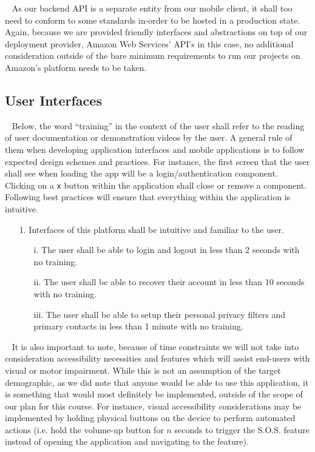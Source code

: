 \documentclass{scrreprt}
\begin{document}
\par ~ As our backend API is a separate entity from our mobile client, it shall too need to conform to some standards in-order to be hosted in a production state. Again, because we are provided friendly interfaces and abstractions on top of our deployment provider, Amazon Web Services' API's in this case, no additional consideration outside of the bare minimum requirements to run our projects on Amazon's platform needs to be taken.


\subsection{User Interfaces}
\par ~ Below, the word ``training'' in the context of the user shall refer to the reading of user documentation or demonstration videos by the user. A general rule of them when developing application interfaces and mobile applications is to follow expected design schemes and practices. For instance, the first screen that the user shall see when loading the app will be a login/authentication component. Clicking on a \texttt{x} button within the application shall close or remove a component. Following best practices will ensure that everything within the application is intuitive.
\begin{enumerate}
	\item[1.] Interfaces of this platform shall be intuitive and familiar to the user.
	\begin{itemize}
		\item[i.] The user shall be able to login and logout in less than 2 seconds with no training.
		\item[ii.] The user shall be able to recover their account in less than 10 seconds with no training.
		\item[iii.] The user shall be able to setup their personal privacy filters and primary contacts in less than 1 minute with no training.
	\end{itemize}
\end{enumerate}
\par ~ It is also important to note, because of time constraints we will not take into consideration accessibility necessities and features which will assist end-users with visual or motor impairment. While this is not an assumption of the target demographic, as we did note that anyone would be able to use this application, it is something that would most definitely be implemented, outside of the scope of our plan for this course. For instance, visual accessibility considerations may be implemented by holding physical buttons on the device to perform automated actions (i.e. hold the volume-up button for $n$ seconds to trigger the S.O.S. feature instead of opening the application and navigating to the feature).
\end{document}
